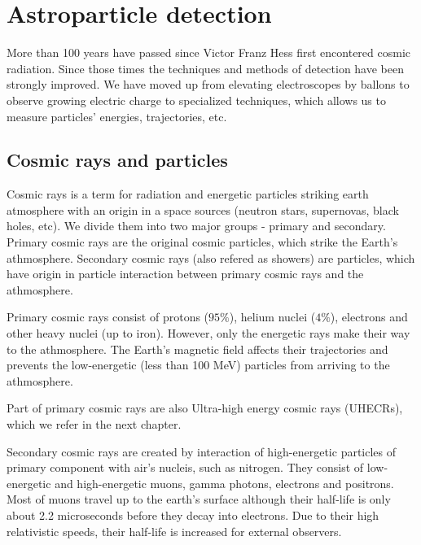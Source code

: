 
\chapter{Astroparticle detection}
More than 100 years have passed since Victor Franz Hess first encontered cosmic radiation. Since those times the techniques and methods of detection have been strongly improved. We have moved up from elevating electroscopes by ballons to observe growing electric charge to specialized techniques, which allows us to measure particles' energies, trajectories, etc.

\section{Cosmic rays and particles}
Cosmic rays is a term for radiation and energetic particles striking earth atmosphere with an origin in a space sources (neutron stars, supernovas, black holes, etc). We divide them into two major groups - primary and secondary. Primary cosmic rays are the original cosmic particles, which strike the Earth's athmosphere. Secondary cosmic rays (also refered as showers) are particles, which have origin in particle interaction between primary cosmic rays and the athmosphere.
\par
Primary cosmic rays consist of protons ($95 \%$), helium nuclei ($4 \%$), electrons and other heavy nuclei (up to iron). However, only the energetic rays make their way to the athmosphere. The Earth's magnetic field affects their trajectories and prevents the low-energetic (less than 100 MeV) particles from arriving to the athmosphere.
\par
Part of primary cosmic rays are also Ultra-high energy cosmic rays (UHECRs), which we refer in the next chapter.
\par
Secondary cosmic rays are created by interaction of high-energetic particles of primary component with air's nucleis, such as nitrogen. They consist of low-energetic and high-energetic muons, gamma photons, electrons and positrons. Most of muons travel up to the earth's surface although their half-life is only about 2.2 microseconds before they decay into electrons. Due to their high relativistic speeds, their half-life is increased for external observers. 

